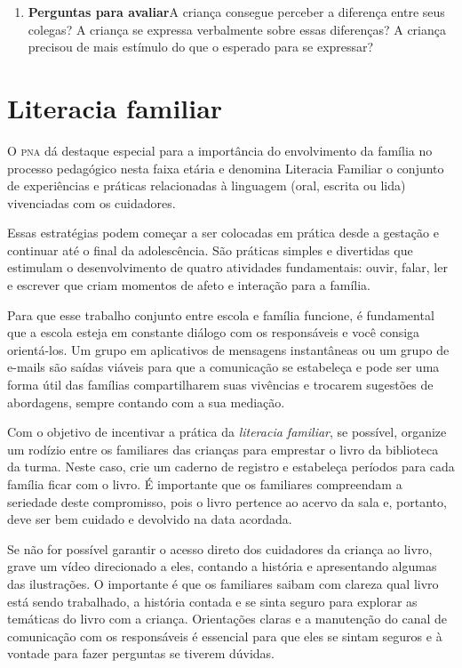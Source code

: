 \documentclass[11pt]{extarticle}
\begin{document}
\begin{enumerate}
\item \textbf{Perguntas para avaliar}\quad A criança consegue perceber a diferença entre seus colegas? A criança se expressa verbalmente sobre essas diferenças? A criança precisou de mais estímulo do que o esperado para se expressar?
\end{enumerate}


\section{Literacia familiar}
O \textsc{pna} dá destaque especial para a importância do envolvimento da família 
no processo pedagógico nesta faixa etária e denomina Literacia Familiar o conjunto 
de experiências e práticas relacionadas à linguagem (oral, escrita ou lida) vivenciadas 
com os cuidadores. 

Essas estratégias podem começar a ser colocadas em prática desde a 
gestação e continuar até o final da adolescência. São práticas simples e divertidas 
que estimulam o desenvolvimento de quatro atividades fundamentais: ouvir, falar, 
ler e escrever que criam momentos de afeto e interação para a família. 

Para que esse trabalho conjunto entre escola e família funcione, é 
fundamental que a escola esteja em constante diálogo com os responsáveis e 
você consiga orientá-los. Um grupo em aplicativos de mensagens instantâneas ou um 
grupo de e-mails são saídas viáveis para que a comunicação se estabeleça e pode ser 
uma forma útil das famílias compartilharem suas vivências e trocarem sugestões 
de abordagens, sempre contando com a sua mediação. 

Com o objetivo de incentivar 
a prática da \textit{literacia familiar}, se possível, organize um rodízio entre os familiares 
das crianças para emprestar o livro da biblioteca da turma. Neste caso, crie um caderno 
de registro e estabeleça períodos para cada família ficar com o livro. É importante 
que os familiares compreendam a seriedade deste compromisso, pois o livro pertence 
ao acervo da sala e, portanto, deve ser bem cuidado e devolvido na data acordada. 

Se não for possível garantir o acesso direto dos cuidadores da criança ao livro, 
grave um vídeo direcionado a eles, contando a história e apresentando algumas 
das ilustrações. O importante é que os familiares saibam com clareza qual livro 
está sendo trabalhado, a história contada e se sinta seguro para explorar as temáticas 
do livro com a criança. Orientações claras e a manutenção do canal de comunicação com 
os responsáveis é essencial para que eles se sintam seguros e à vontade para fazer perguntas 
se tiverem dúvidas. 
\end{document}
